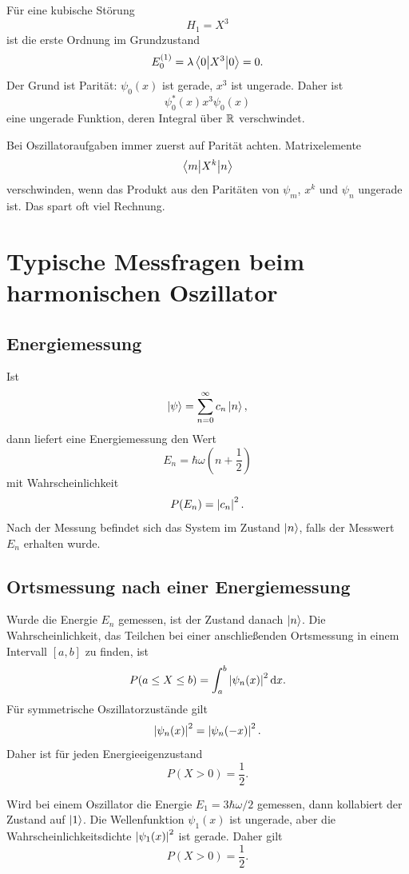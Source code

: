 Für eine kubische Störung
\[
    H_1=X^3
\]
ist die erste Ordnung im Grundzustand
\[
    E_0^{(1)}=\lambda\left\langle0\middle|X^3\middle|0\right\rangle=0.
\]
Der Grund ist Parität: $\psi_0(x)$ ist gerade, $x^3$ ist ungerade. Daher ist
\[
    \psi_0^*(x)x^3\psi_0(x)
\]
eine ungerade Funktion, deren Integral über $\mathbb{R}$ verschwindet.

\begin{examtipbox}
Bei Oszillatoraufgaben immer zuerst auf Parität achten. Matrixelemente
\[
    \left\langle m\middle|X^k\middle|n\right\rangle
\]
verschwinden, wenn das Produkt aus den Paritäten von $\psi_m$, $x^k$ und $\psi_n$ ungerade ist. Das spart oft viel Rechnung.
\end{examtipbox}

\section{Typische Messfragen beim harmonischen Oszillator}

\subsection{Energiemessung}

Ist
\[
    \left|\psi\right\rangle=\sum_{n=0}^{\infty}c_n\left|n\right\rangle,
\]
dann liefert eine Energiemessung den Wert
\[
    E_n=\hbar\omega\left(n+\frac12\right)
\]
mit Wahrscheinlichkeit
\[
    P(E_n)=\left| c_n \right|^2.
\]
Nach der Messung befindet sich das System im Zustand $\left|n\right\rangle$, falls der Messwert $E_n$ erhalten wurde.

\subsection{Ortsmessung nach einer Energiemessung}

Wurde die Energie $E_n$ gemessen, ist der Zustand danach $\left|n\right\rangle$. Die Wahrscheinlichkeit, das Teilchen bei einer anschließenden Ortsmessung in einem Intervall $[a,b]$ zu finden, ist
\[
    P(a\le X\le b)=\int_a^b\left| \psi_n(x) \right|^2\mathrm{d} x.
\]
Für symmetrische Oszillatorzustände gilt
\[
    \left| \psi_n(x) \right|^2=\left| \psi_n(-x) \right|^2.
\]
Daher ist für jeden Energieeigenzustand
\[
    P(X>0)=\frac12.
\]

\begin{examplebox}
Wird bei einem Oszillator die Energie $E_1=3\hbar\omega/2$ gemessen, dann kollabiert der Zustand auf $\left|1\right\rangle$. Die Wellenfunktion $\psi_1(x)$ ist ungerade, aber die Wahrscheinlichkeitsdichte $\left| \psi_1(x) \right|^2$ ist gerade. Daher gilt
\[
    P(X>0)=\frac12.
\]
\end{examplebox}

